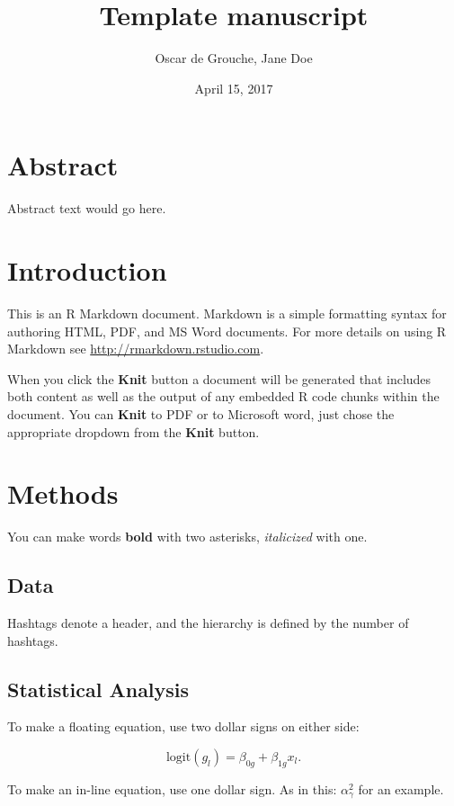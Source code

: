 \documentclass[]{article}
\title{Template manuscript}
\author{Oscar de Grouche, Jane Doe}
\date{April 15, 2017}
\begin{document}
\maketitle

\section{Abstract}\label{abstract}

Abstract text would go here.

\section{Introduction}\label{introduction}

This is an R Markdown document. Markdown is a simple formatting syntax
for authoring HTML, PDF, and MS Word documents. For more details on
using R Markdown see \url{http://rmarkdown.rstudio.com}.

When you click the \textbf{Knit} button a document will be generated
that includes both content as well as the output of any embedded R code
chunks within the document. You can \textbf{Knit} to PDF or to Microsoft
word, just chose the appropriate dropdown from the \textbf{Knit} button.

\section{Methods}\label{methods}

You can make words \textbf{bold} with two asterisks, \emph{italicized}
with one.

\subsection{Data}\label{data}

Hashtags denote a header, and the hierarchy is defined by the number of
hashtags.

\subsection{Statistical Analysis}\label{statistical-analysis}

To make a floating equation, use two dollar signs on either side:

\[
\text{logit}(g_l) = \beta_{0g} + \beta_{1g}x_l.
\]

To make an in-line equation, use one dollar sign. As in this:
\(\alpha_\gamma^2\) for an example.
\end{document}
